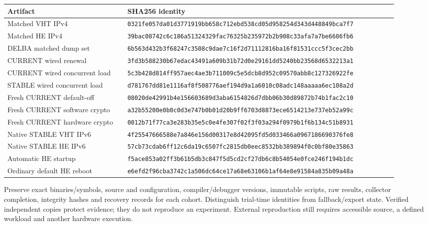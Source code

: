 \documentclass[11pt,letterpaper,oneside]{article}
\begin{document}
\begingroup\renewcommand{\arraystretch}{1.05}
\begin{longtable}{p{0.29\linewidth}p{0.63\linewidth}}\toprule Artifact & SHA256 identity\\\midrule\endhead
Matched VHT IPv4 & {\scriptsize\texttt{0321fe057da01d3771919bb658c712ebd538cd05d958254d343d448849bca7f7}}\\
Matched HE IPv4 & {\scriptsize\texttt{39bac08742c6c186a51324329fac76325b235972b2b908c33afa7a7be6686fb6}}\\
DELBA matched dump set & {\scriptsize\texttt{6b563d432b3f68247c3508c9dae7c16f2d71112816ba16f81531ccc5f3cec2bb}}\\
CURRENT wired renewal & {\scriptsize\texttt{3fd3b588230b67edac43491a609b31b72d0e29161dd5240bb23568d6532213a1}}\\
CURRENT wired concurrent load & {\scriptsize\texttt{5c3b428d814ff957aec4ae3b711009c5e5dcb8d952c09570abb8c127326922fe}}\\
STABLE wired concurrent load & {\scriptsize\texttt{d781767dd81e1116af8f508776aef194d9a1a6010c08adc148aaaaa6ec108a2d}}\\Fresh CURRENT default-off & {\scriptsize\texttt{08020de42991b4e156603689d3aba6154826d7dbb06b30d89872b74b1fac2c10}}\\
Fresh CURRENT software crypto & {\scriptsize\texttt{a32b55200e0b0c0d3e747b0b01d20b9ff6703d8873ece6514213e737eb52a99c}}\\
Fresh CURRENT hardware crypto & {\scriptsize\texttt{0012b71f77ca3e283b35e5c0e4fe307f02f3f03a294f0979b1f6b134c51b8931}}\\
Native STABLE VHT IPv6 & {\scriptsize\texttt{4f25547666588e7a846e156d00317e8d42095fd5d033466a0967186690376fe8}}\\
Native STABLE HE IPv6 & {\scriptsize\texttt{57cb73cdab6ff12c6da19c6507fc2815db0eec8532bb389894f0c0bf80e35863}}\\
Automatic HE startup & {\scriptsize\texttt{f5ace853a02ff3b61b5db3c847f5d5cd2cf27db6c8b54054e0fce246f194b1dc}}\\
Ordinary default HE reboot & {\scriptsize\texttt{e6efd2f96cba3742c1a506dc64ce17a68e63106b1af64e8e91584a835b09a48a}}\\
\bottomrule\end{longtable}\endgroup
Preserve exact binaries/symbols, source and configuration, compiler/debugger versions, immutable scripts, raw results, collector completion, integrity hashes and recovery records for each cohort. Distinguish trial-time identities from fallback/export state. Verified independent copies protect evidence; they do not reproduce an experiment. External reproduction still requires accessible source, a defined workload and another hardware execution.
\end{document}
